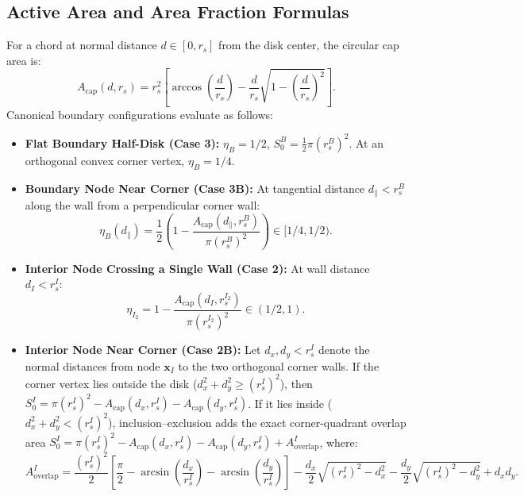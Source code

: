 \documentclass[VANCOUVER,Times1COL]{WileyNJD-v5}
\begin{document}
\subsection{Active Area and Area Fraction Formulas}
For a chord at normal distance $d \in [0, r_s]$ from the disk center, the circular cap area is:
\begin{equation}
    A_{\mathrm{cap}}(d, r_s) = r_s^2 \left[ \arccos\left(\frac{d}{r_s}\right) - \frac{d}{r_s} \sqrt{1 - \left(\frac{d}{r_s}\right)^2} \right].
    \label{eq:cap_area_formula}
\end{equation}
Canonical boundary configurations evaluate as follows:
\begin{itemize}
    \item \textbf{Flat Boundary Half-Disk (Case 3):} $\eta_B = 1/2$, $S_0^B = \frac{1}{2} \pi (r_s^B)^2$. At an orthogonal convex corner vertex, $\eta_B = 1/4$.
    \item \textbf{Boundary Node Near Corner (Case 3B):} At tangential distance $d_{\parallel} < r_s^B$ along the wall from a perpendicular corner wall:
          \begin{equation}
              \eta_B(d_{\parallel}) = \frac{1}{2} \left( 1 - \frac{A_{\mathrm{cap}}(d_{\parallel}, r_s^B)}{\pi (r_s^B)^2} \right) \in [1/4, 1/2).
              \label{eq:eta_boundary_near_corner}
          \end{equation}
    \item \textbf{Interior Node Crossing a Single Wall (Case 2):} At wall distance $d_I < r_s^I$:
          \begin{equation}
              \eta_{I_2} = 1 - \frac{A_{\mathrm{cap}}(d_I, r_s^{I_2})}{\pi (r_s^{I_2})^2} \in (1/2, 1).
              \label{eq:eta_circular_cap}
          \end{equation}
    \item \textbf{Interior Node Near Corner (Case 2B):} Let $d_x, d_y < r_s^I$ denote the normal distances from node $\mathbf{x}_I$ to the two orthogonal corner walls. If the corner vertex lies outside the disk ($d_x^2 + d_y^2 \ge (r_s^I)^2$), then $S_0^I = \pi (r_s^I)^2 - A_{\mathrm{cap}}(d_x, r_s^I) - A_{\mathrm{cap}}(d_y, r_s^I)$. If it lies inside ($d_x^2 + d_y^2 < (r_s^I)^2$), inclusion--exclusion adds the exact corner-quadrant overlap area $S_0^I = \pi (r_s^I)^2 - A_{\mathrm{cap}}(d_x, r_s^I) - A_{\mathrm{cap}}(d_y, r_s^I) + A_{\mathrm{overlap}}^I$, where:
          \begin{equation}
              A_{\mathrm{overlap}}^I = \frac{(r_s^I)^2}{2} \left[ \frac{\pi}{2} - \arcsin\left(\frac{d_x}{r_s^I}\right) - \arcsin\left(\frac{d_y}{r_s^I}\right) \right] - \frac{d_x}{2}\sqrt{(r_s^I)^2 - d_x^2} - \frac{d_y}{2}\sqrt{(r_s^I)^2 - d_y^2} + d_x d_y.
              \label{eq:corner_overlap_formula}
          \end{equation}
\end{itemize}
\end{document}
